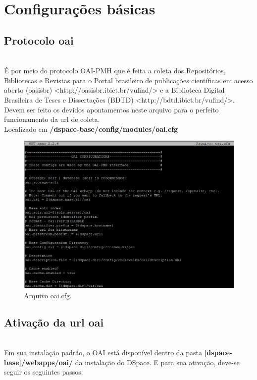 \documentclass[12pt,hidelinks]{article}
\begin{document}
\newpage
\section{Configurações básicas}
\newpage
      \subsection{Protocolo oai}\\
 
      É por meio do protocolo OAI-PMH que é feita a coleta dos Repositórios, Bibliotecas e Revistas para o Portal brasileiro de publicações científicas em acesso aberto (oasisbr) <http://oasisbr.ibict.br/vufind/>  e a Biblioteca Digital Brasileira de Teses e Dissertações (BDTD) <http://bdtd.ibict.br/vufind/>. Devem ser feito os devidos apontamentos neste arquivo para o perfeito funcionamento da url de coleta.\\
      
      Localizado em \textbf{/dspace-base/config/modules/oai.cfg} 

          \begin{figure}[!htp]
                \centering
                \includegraphics[scale=0.9]{figura/oai.png}
                \caption{Arquivo oai.cfg.}
            \label{Rotulo}
          \end{figure}
        
    \subsection{Ativação da url oai}\\
   
    Em sua instalação padrão, o OAI está disponível dentro da pasta \textbf{[dspace-base]/webapps/oai/} da instalação do DSpace. E para sua ativação, deve-se seguir os seguintes passos:
        
\end{document}
